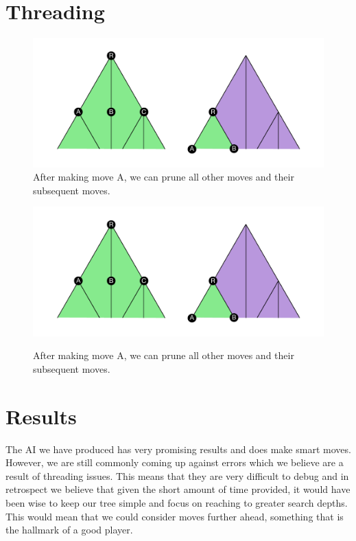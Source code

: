 \documentclass[a4paper, 12pt]{article}
\begin{document}
\section{Threading}
\begin{figure}[h!]
  \centering
  	\includegraphics[width = 17cm]{TreePruning}\\
  \caption{After making move A, we can prune all other moves and their subsequent moves.}
  \includegraphics[width = 17cm]{TreePruning}\\
  \caption{After making move A, we can prune all other moves and their subsequent moves.}
\end{figure}
\section{Results}
The AI we have produced has very promising results and does make smart moves. However, we are still commonly coming up against errors which we believe are a result of threading issues. This means that they are very difficult to debug and in retrospect we believe that given the short amount of time provided, it would have been wise to keep our tree simple and focus on reaching to greater search depths. This would mean that we could consider moves further ahead, something that is the hallmark of a good player.
\end{document}
